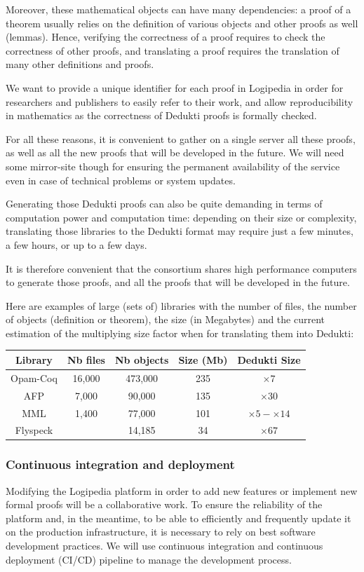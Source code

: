 Moreover, these mathematical objects can have many dependencies: a
proof of a theorem usually relies on the definition of various objects
and other proofs as well (lemmas). Hence, verifying the correctness of
a proof requires to check the correctness of other proofs, and
translating a proof requires the translation of many other definitions
and proofs.

We want to provide a unique identifier for each proof in
Logipedia in order for researchers and publishers to easily refer to
their work, and allow reproducibility in mathematics as the
correctness of Dedukti proofs is formally checked.

For all these reasons, it is convenient to gather on a single server
all these proofs, as well as all the new proofs that will be developed
in the future. We will need some mirror-site though for ensuring the
permanent availability of the service even in case of technical
problems or system updates.

Generating those Dedukti proofs can also be quite demanding in terms
of computation power and computation time: depending on their size or
complexity, translating those libraries to the Dedukti format may
require just a few minutes, a few hours, or up to a few days.

It is therefore convenient that the consortium shares high performance
computers to generate those proofs, and all the proofs that will
be developed in the future.

Here are examples of large (sets of) libraries with the number of
files, the number of objects (definition or theorem), the size (in
Megabytes) and the current estimation of the multiplying size factor
when for translating them into Dedukti:

\begin{center}
\begin{tabular}{|c|c|c|c|c|}\hline
\rowcolor{color2}Library & Nb files & Nb objects & Size (Mb) & Dedukti Size\\\hline
Opam-Coq & 16,000 & 473,000 & 235 & $\times 7$\\\hline
AFP & 7,000 & 90,000 & 135 & $\times 30$\\\hline
MML & 1,400 & 77,000 & 101 & $\times 5-\times 14$\\\hline
Flyspeck & & 14,185 & 34 & $\times 67$\\\hline
\end{tabular}
\end{center}

\subsubsection*{Continuous integration and deployment}
Modifying the Logipedia platform in order to add new features or
implement new formal proofs will be a collaborative work. To ensure
the reliability of the platform and, in the meantime, to be able to
efficiently and frequently update it on the production infrastructure,
it is necessary to rely on best software development practices.  We
will use continuous integration and continuous deployment (CI/CD)
pipeline to manage the development process.

